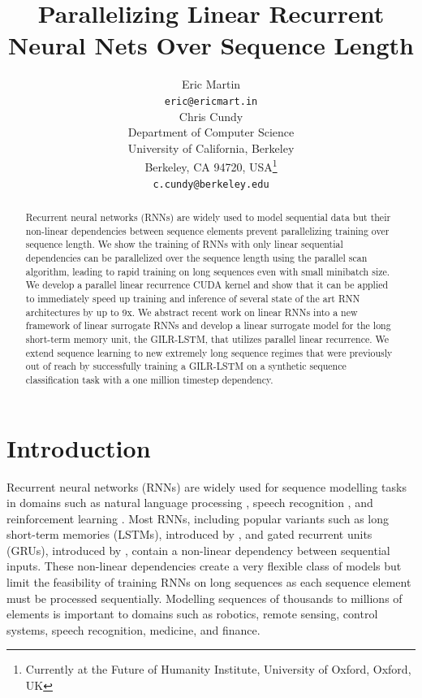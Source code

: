 \documentclass{article}
\title{Parallelizing Linear Recurrent Neural Nets Over Sequence Length}
\author{Eric Martin \\
\texttt{eric@ericmart.in} \\
\And
Chris Cundy \\
Department of Computer Science\\
University of California, Berkeley\\
Berkeley, CA 94720, USA\thanks{Currently at the Future of Humanity Institute, University of Oxford, Oxford, UK} \\
\texttt{c.cundy@berkeley.edu} \\
}
\begin{document}
\maketitle

\begin{abstract}
Recurrent neural networks (RNNs) are widely used to model sequential data but
their non-linear dependencies between sequence elements prevent parallelizing
training over sequence length. We show the training of RNNs with only linear
sequential dependencies can be parallelized over the sequence length using the
parallel scan algorithm, leading to rapid training on long sequences even with
small minibatch size. We develop a parallel linear recurrence CUDA kernel and
show that it can be applied to immediately speed up training and inference of
several state of the art RNN architectures by up to 9x.  We abstract recent work
on linear RNNs into a new framework of linear surrogate RNNs and develop a
linear surrogate model for the long short-term memory unit, the GILR-LSTM, that
utilizes parallel linear recurrence.  We extend sequence learning to new
extremely long sequence regimes that were previously out of reach by
successfully training a GILR-LSTM on a synthetic sequence classification task
with a one million timestep dependency.
\end{abstract}

\section{Introduction}
Recurrent neural networks (RNNs) are widely used for sequence modelling tasks in
domains such as natural language processing \citep{sutskever2014sequence},
speech recognition \citep{amodei2015deep}, and reinforcement learning
\citep{hausknecht2015deep}. Most RNNs, including popular variants such as long
short-term memories (LSTMs), introduced by \citet{hochreiter1997long}, and gated
recurrent units (GRUs), introduced by \citet{cho2014learning}, contain a non-linear dependency
between sequential inputs. These non-linear dependencies create a very flexible
class of models but limit the feasibility of training RNNs on long sequences as
each sequence element must be processed sequentially.  Modelling sequences of
thousands to millions of elements is important to domains such as robotics,
remote sensing, control systems, speech recognition, medicine, and finance.
\end{document}
